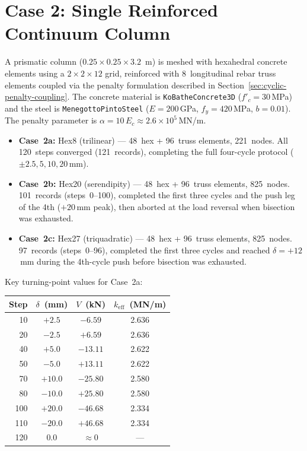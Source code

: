 \section{Case 2: Single Reinforced Continuum Column}
\label{sec:cyclic-case2}

A prismatic column ($0.25 \times 0.25 \times 3.2$~m) is meshed with
hexahedral concrete elements using a $2 \times 2 \times 12$ grid,
reinforced with 8~longitudinal rebar truss elements coupled via the
penalty formulation described in Section~\ref{sec:cyclic-penalty-coupling}.
The concrete material is \texttt{KoBatheConcrete3D} ($f'_c = 30$\,MPa)
and the steel is \texttt{MenegottoPintoSteel} ($E = 200$\,GPa,
$f_y = 420$\,MPa, $b = 0.01$).  The penalty parameter is
$\alpha = 10\,E_c \approx 2.6 \times 10^5$\,MN/m.

\begin{itemize}
  \item \textbf{Case~2a:} Hex8 (trilinear) --- 48~hex +
    96~truss elements, 221~nodes.  All 120~steps converged
    (121~records), completing the full four-cycle protocol
    ($\pm 2.5, 5, 10, 20$\,mm).
  \item \textbf{Case~2b:} Hex20 (serendipity) --- 48~hex +
    96~truss elements, 825~nodes.  101~records (steps~0--100),
    completed the first three cycles and the push leg of the 4th
    ($+20$\,mm peak), then aborted at the load reversal when
    bisection was exhausted.
  \item \textbf{Case~2c:} Hex27 (triquadratic) --- 48~hex +
    96~truss elements, 825~nodes.  97~records (steps~0--96),
    completed the first three cycles and reached $\delta = +12$\,mm
    during the 4th-cycle push before bisection was exhausted.
\end{itemize}

Key turning-point values for Case~2a:

\begin{center}
\begin{tabular}{rccc}
\toprule
\textbf{Step} & $\delta$~(mm) & $V$~(kN) & $k_{\text{eff}}$~(MN/m) \\
\midrule
 10 & $+2.5$  & $-6.59$  & 2.636 \\
 20 & $-2.5$  & $+6.59$  & 2.636 \\
 40 & $+5.0$  & $-13.11$ & 2.622 \\
 50 & $-5.0$  & $+13.11$ & 2.622 \\
 70 & $+10.0$ & $-25.80$ & 2.580 \\
 80 & $-10.0$ & $+25.80$ & 2.580 \\
100 & $+20.0$ & $-46.68$ & 2.334 \\
110 & $-20.0$ & $+46.68$ & 2.334 \\
120 & $0.0$   & $\approx 0$ & --- \\
\bottomrule
\end{tabular}
\end{center}

